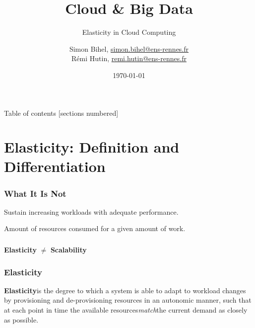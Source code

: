 \documentclass{beamer}
\title{Cloud \& Big Data}
\subtitle{Elasticity in Cloud Computing}
\date{\today}
\author{%
  Simon Bihel, \url{simon.bihel@ens-rennes.fr} \\
  Rémi Hutin, \url{remi.hutin@ens-rennes.fr}
}
\institute{%
  University of Rennes I \\
  École normale supérieure de Rennes
}
\begin{document}
\maketitle

\begin{frame}{Table of contents}
  [sections numbered]
  \tableofcontents[hideallsubsections]
\end{frame}


\section{Elasticity: Definition and Differentiation}
\begin{frame}
  \frametitle{What It Is Not~\cite{herbst2013elasticity}}
  \begin{description}
    \parbox{\linewidth}{
    \item[Scalability] Sustain increasing workloads with adequate performance.
    \item[Efficiency] Amount of resources consumed for a given amount of work.
    }
  \end{description}
\end{frame}


\begin{frame}
  \frametitle{}
  \centering
  \Large\textbf{Elasticity} $\neq$ \textbf{Scalability}
  
\end{frame}

\begin{frame}
  \frametitle{Elasticity~\cite{herbst2013elasticity}~\cite{galante2012survey}~\cite{gulati2011cloud}~\cite{sharma2011cost}~\cite{moore2013coordinated}}
  \begin{definition}
  \parbox{\linewidth}{\textbf{Elasticity}is the degree to which a system is able to adapt to workload changes by provisioning and de-provisioning resources in an autonomic manner, such that at each point in time the available resources\textit{match}the current demand as closely as possible.
  }
  \end{definition}
\end{frame}
\end{document}
